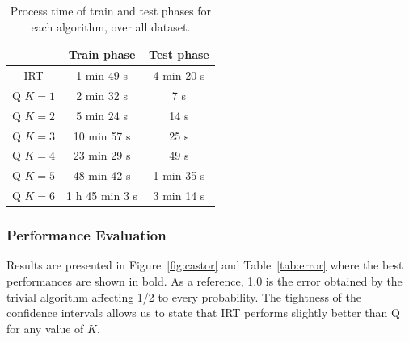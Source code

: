 \documentclass{sig-alternate}
\begin{document}
\begin{table}[H]
\centering\begin{tabular}{@{}c|cc@{}}
& Train phase & Test phase\\
\hline
IRT & 1 min 49 s & 4 min 20 s\\%
Q $K = 1$ & 2 min 32 s & 7 s\\
Q $K = 2$ & 5 min 24 s & 14 s\\
Q $K = 3$ & 10 min 57 s & 25 s\\ %
Q $K = 4$ & 23 min 29 s & 49 s\\ %
Q $K = 5$ & 48 min 42 s & 1 min 35 s\\ %
Q $K = 6$ & 1 h 45 min 3 s & 3 min 14 s %
\end{tabular}
\caption{Process time of train and test phases for each algorithm, over all dataset.}
\label{tab:time}
\end{table}

\subsubsection{Performance Evaluation}

Results are presented in Figure~\ref{fig:castor} and Table~\ref{tab:error} where the best performances are shown in bold. As a reference, 1.0 is the error obtained by the trivial algorithm affecting 1/2 to every probability. The tightness of the confidence intervals allows us to state that IRT performs slightly better than Q for any value of $K$. %
\end{document}
